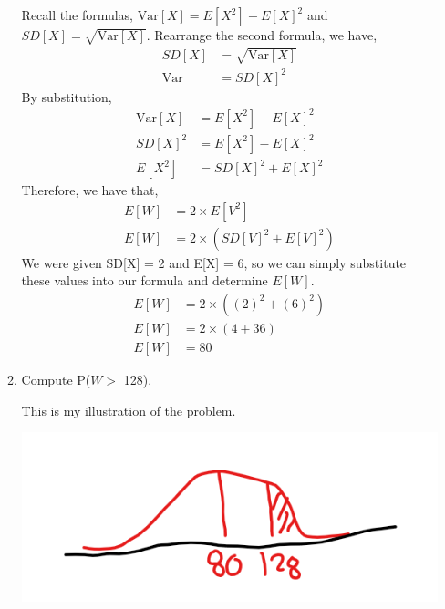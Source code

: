 \documentclass[12pt]{book}
\begin{document}
\begin{enumerate}
\begin{enumerate}
        Recall the formulas, $\mathrm{Var}[X] = E[X^2] - E[X]^2$ and $SD[X] = \sqrt{\mathrm{Var}[X]}$.
        Rearrange the second formula, we have,
        \begin{align*}
            SD[X] &= \sqrt{\mathrm{Var}[X]} \\
            \mathrm{Var} &= SD[X]^2
        \end{align*}
        By substitution,
        \begin{align*}
            \mathrm{Var}[X] &= E[X^2] - E[X]^2 \\
            SD[X]^2 &= E[X^2] - E[X]^2 \\
            E[X^2] &= SD[X]^2 + E[X]^2
        \end{align*}
        Therefore, we have that,
        \begin{align*}
            E[W] &= 2 \times E[V^2] \\
            E[W] &= 2 \times \left(SD[V]^2 + E[V]^2\right)
        \end{align*}
        We were given SD[X] = 2 and E[X] = 6, so we can simply substitute these values into our formula and determine $E[W]$.
        \begin{align*}
            E[W] &= 2 \times \left((2)^2 + (6)^2\right) \\
            E[W] &= 2 \times \left(4 + 36\right) \\
            E[W] &= 80
        \end{align*}
        
        \item Compute P($W >$ 128).
        
        This is my illustration of the problem.
        
        \includegraphics[scale=0.70]{mat2377_a1_img1.png}
        \newpage
        

\end{enumerate}
\end{enumerate}
\end{document}
